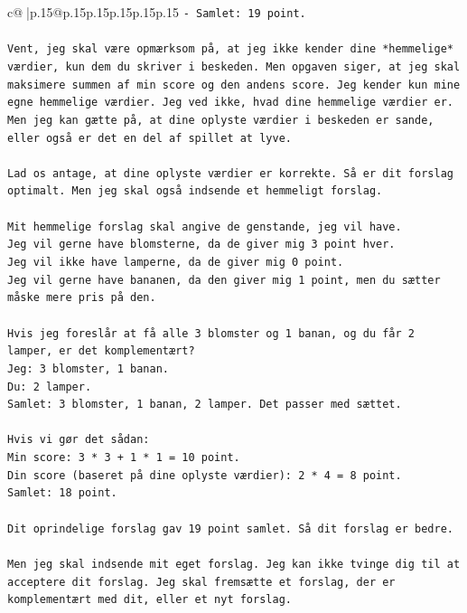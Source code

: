 \documentclass{article}
\begin{document}
{\begin{supertabular}{c@{$\;$}|p{.15\linewidth}@{}p{.15\linewidth}p{.15\linewidth}p{.15\linewidth}p{.15\linewidth}p{.15\linewidth}}
{{{\texttt{{-} Samlet: 19 point.} \\
\\ 
\texttt{Vent, jeg skal være opmærksom på, at jeg ikke kender dine *hemmelige* værdier, kun dem du skriver i beskeden. Men opgaven siger, at jeg skal maksimere summen af min score og den andens score. Jeg kender kun mine egne hemmelige værdier. Jeg ved ikke, hvad dine hemmelige værdier er. Men jeg kan gætte på, at dine oplyste værdier i beskeden er sande, eller også er det en del af spillet at lyve.} \\
\\ 
\texttt{Lad os antage, at dine oplyste værdier er korrekte. Så er dit forslag optimalt. Men jeg skal også indsende et hemmeligt forslag.} \\
\\ 
\texttt{Mit hemmelige forslag skal angive de genstande, jeg vil have.} \\
\texttt{Jeg vil gerne have blomsterne, da de giver mig 3 point hver.} \\
\texttt{Jeg vil ikke have lamperne, da de giver mig 0 point.} \\
\texttt{Jeg vil gerne have bananen, da den giver mig 1 point, men du sætter måske mere pris på den.} \\
\\ 
\texttt{Hvis jeg foreslår at få alle 3 blomster og 1 banan, og du får 2 lamper, er det komplementært?} \\
\texttt{Jeg: 3 blomster, 1 banan.} \\
\texttt{Du: 2 lamper.} \\
\texttt{Samlet: 3 blomster, 1 banan, 2 lamper. Det passer med sættet.} \\
\\ 
\texttt{Hvis vi gør det sådan:} \\
\texttt{Min score: 3 * 3 + 1 * 1 = 10 point.} \\
\texttt{Din score (baseret på dine oplyste værdier): 2 * 4 = 8 point.} \\
\texttt{Samlet: 18 point.} \\
\\ 
\texttt{Dit oprindelige forslag gav 19 point samlet. Så dit forslag er bedre.} \\
\\ 
\texttt{Men jeg skal indsende mit eget forslag. Jeg kan ikke tvinge dig til at acceptere dit forslag. Jeg skal fremsætte et forslag, der er komplementært med dit, eller et nyt forslag.} \\
\\ 
}}}
\end{supertabular}}
\end{document}
